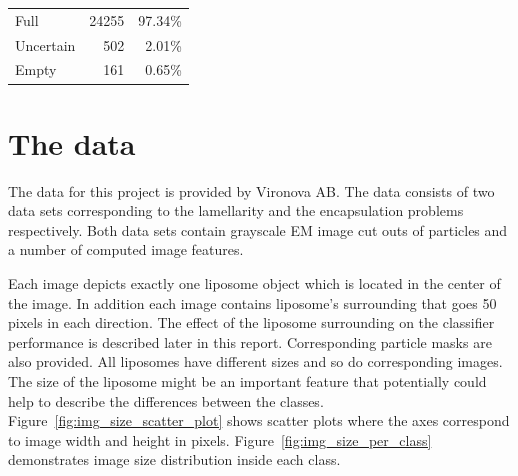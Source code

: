 \documentclass[a4paper, 11pt, table]{article}
\begin{document}
\begin{center}
\label{table:encapsulation_dataset}
\begin{tabular}{lrr}
\toprule
Full & \num{24255} & 97.34\% \\ 
Uncertain & \num{502} & 2.01\% \\ 
Empty & \num{161} & 0.65\% \\ 
\end{tabular} 
\end{center}

\section{The data}
\label{sec:dataset}
The data for this project is provided by Vironova AB. The data consists of two data sets corresponding to the lamellarity and the encapsulation problems respectively. Both data sets contain grayscale EM image cut outs of particles and a number of computed image features.

Each image depicts exactly one liposome object which is located in the center of the image. In addition each image contains liposome's surrounding that goes 50 pixels in each direction. The effect of the liposome surrounding on the classifier performance is described later in this report. Corresponding particle masks are also provided. All liposomes have different sizes and so do corresponding images. The size of the liposome might be an important feature that potentially could help to describe the differences between the classes.  Figure~\ref{fig:img_size_scatter_plot} shows scatter plots where the axes correspond to image width and height in pixels. Figure~\ref{fig:img_size_per_class} demonstrates image size distribution inside each class.
\end{document}
